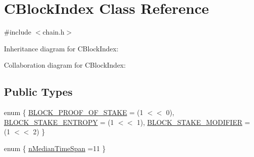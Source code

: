 \hypertarget{class_c_block_index}{}\section{C\+Block\+Index Class Reference}
\label{class_c_block_index}


{\ttfamily \#include $<$chain.\+h$>$}



Inheritance diagram for C\+Block\+Index\+:


Collaboration diagram for C\+Block\+Index\+:
\subsection*{Public Types}
\begin{DoxyCompactItemize}
\item 
enum \{ \hyperlink{class_c_block_index_a9f5cdb9616b0204a8906522bdc26415fa4c927ae8b8da1c98a36e08ea135e05bd}{B\+L\+O\+C\+K\+\_\+\+P\+R\+O\+O\+F\+\_\+\+O\+F\+\_\+\+S\+T\+A\+K\+E} = (1 $<$$<$ 0), 
\hyperlink{class_c_block_index_a9f5cdb9616b0204a8906522bdc26415fa36c8a91027af713584d66e1244328e3d}{B\+L\+O\+C\+K\+\_\+\+S\+T\+A\+K\+E\+\_\+\+E\+N\+T\+R\+O\+P\+Y} = (1 $<$$<$ 1), 
\hyperlink{class_c_block_index_a9f5cdb9616b0204a8906522bdc26415fa2081c64af805f5bccec3b8486ee9d5ec}{B\+L\+O\+C\+K\+\_\+\+S\+T\+A\+K\+E\+\_\+\+M\+O\+D\+I\+F\+I\+E\+R} = (1 $<$$<$ 2)
 \}
\item 
enum \{ \hyperlink{class_c_block_index_aa518b1ab90f8a0bb1df29da6063d886baa2b8ad73c4fe37a8de8748d949c334d4}{n\+Median\+Time\+Span} =11
 \}
\end{DoxyCompactItemize}
